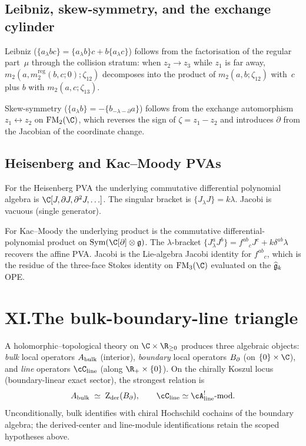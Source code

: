 \subsection*{Leibniz, skew-symmetry, and the exchange cylinder}

Leibniz ($\{a_\lambda bc\} = \{a_\lambda b\}c +
b\{a_\lambda c\}$) follows from the factorisation of the regular
part~$\mu$ through the collision stratum: when $z_2 \to z_3$ while
$z_1$ is far away, $m_2(a, m_2^{\mathrm{reg}}(b,c;0); \zeta_{12})$
decomposes into the product of $m_2(a,b;\zeta_{12})$ with~$c$ plus
$b$ with $m_2(a,c;\zeta_{13})$.

Skew-symmetry ($\{a_\lambda b\} = -\{b_{-\lambda-\partial} a\}$)
follows from the exchange automorphism $z_1 \leftrightarrow z_2$ on
$\FM_2(\C)$, which reverses the sign of $\zeta = z_1 - z_2$ and
introduces $\partial$ from the Jacobian of the coordinate change.

\subsection*{Heisenberg and Kac--Moody PVAs}

For the Heisenberg PVA the underlying commutative differential
polynomial algebra is $\C[J,\partial J,\partial^2J,\ldots]$.  The
singular bracket is
$\{J_\lambda J\} = k\lambda$. Jacobi is
vacuous (single generator).

For Kac--Moody the underlying product is the commutative
differential-polynomial product on
\(\operatorname{Sym}(\C[\partial]\otimes\fg)\). The
$\lambda$-bracket $\{J^a_\lambda J^b\} = f^{ab}{}_c J^c +
k\delta^{ab}\lambda$ recovers the affine PVA\@. Jacobi is the
Lie-algebra Jacobi identity for $f^{ab}{}_c$, which is the
residue of the three-face Stokes identity on $\FM_3(\C)$ evaluated
on the $\widehat{\mathfrak{g}}_k$ OPE.


\section*{XI.\quad The bulk-boundary-line triangle}

A holomorphic--topological theory on $\C \times \R_{\ge 0}$
produces three algebraic objects: \emph{bulk} local operators
$A_{\mathrm{bulk}}$ (interior), \emph{boundary} local operators $B_{\partial}$
(on $\{0\} \times \C$), and \emph{line} operators
$\cC_{\mathrm{line}}$ (along $\R_+ \times \{0\}$).
On the chirally Koszul locus (boundary-linear exact sector),
the strongest relation is
\[
\Abulk
\;\simeq\;
\Zder(\Bbound),
\qquad
\cC_{\mathrm{line}} \simeq \cA^!_{\mathrm{line}}\text{-mod}.
\]
Unconditionally, bulk identifies with chiral Hochschild cochains
of the boundary algebra; the derived-center and line-module
identifications retain the scoped hypotheses above.

